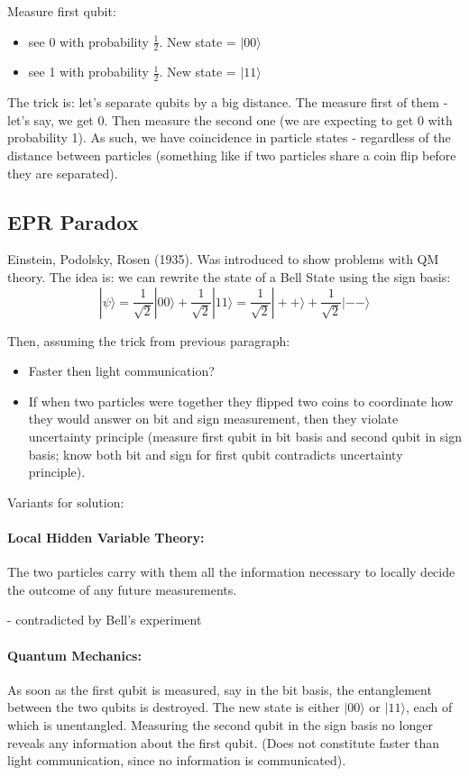 \documentclass{scrartcl}
\begin{document}
Measure first qubit:
\begin{itemize}
\item see 0 with probability $\frac1{2}$. New state = $|00\rangle$
\item see 1 with probability $\frac1{2}$. New state = $|11\rangle$
\end{itemize}
The trick is: let's separate qubits by a big distance. The measure first of them
- let's say, we get 0. Then measure the second one (we are expecting to get 0
with probability 1). As such, we have coincidence in particle states -
regardless of the distance between particles (something like if two particles
share a coin flip before they are separated).

\subsection{EPR Paradox}
\label{sec:3-4}

Einstein, Podolsky, Rosen (1935). Was introduced to show problems with QM
theory. The idea is: we can rewrite the state of a Bell State using the sign
basis:
$$|\psi\rangle = \frac1{\sqrt{2}} |00\rangle + \frac1{\sqrt{2}}|11\rangle =
\frac1{\sqrt{2}} |++\rangle + \frac1{\sqrt{2}}|--\rangle $$

Then, assuming the trick from previous paragraph:
\begin{itemize}
\item Faster then light communication?
\item If when two particles were together they flipped two coins to coordinate
  how they would answer on bit and sign measurement, then they violate
  uncertainty principle (measure first qubit in bit basis and second qubit in
  sign basis; know both bit and sign for first qubit contradicts uncertainty
  principle).
\end{itemize}
Variants for solution:
\paragraph{Local Hidden Variable Theory:} The two particles carry with them all
the information necessary to locally decide the outcome of any future
measurements.

- contradicted by Bell's experiment

\paragraph{Quantum Mechanics:} As soon as the first qubit is measured, say in
the bit basis, the entanglement between the two qubits is destroyed. The new
state is either $|00\rangle$ or $|11\rangle$, each of which is unentangled.
Measuring the second qubit in the sign basis no longer reveals any information
about the first qubit. (Does not constitute faster than light communication,
since no information is communicated).
\end{document}
